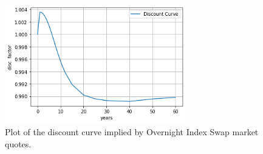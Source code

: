 \begin{figure}[htb]
  \centering
  \includegraphics[width=0.7\textwidth]{bootstrap_files/bootstrap_23_0.png}
  \caption{Plot of the discount curve implied by Overnight Index Swap market quotes.}
  \label{fig:discount_curve}
\end{figure}

